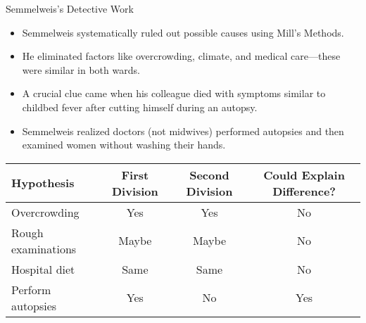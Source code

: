 \documentclass{beamer}
\begin{document}
\begin{frame}{Semmelweis's Detective Work}
    \begin{itemize}
        \item Semmelweis systematically ruled out possible causes using Mill's Methods.
        \item He eliminated factors like overcrowding, climate, and medical care—these were similar in both wards.
        \item A crucial clue came when his colleague died with symptoms similar to childbed fever after cutting himself during an autopsy.
        \item Semmelweis realized doctors (not midwives) performed autopsies and then examined women without washing their hands.
    \end{itemize}
    
    \begin{table}
        \scriptsize
        \centering
        \begin{tabular}{|l|c|c|c|}
            \hline
            \textbf{Hypothesis} & \textbf{First Division} & \textbf{Second Division} & \textbf{Could Explain Difference?} \\
            \hline
            Overcrowding & Yes & Yes & No \\
            \hline
            Rough examinations & Maybe & Maybe & No \\
            \hline
            Hospital diet & Same & Same & No \\
            \hline
            Perform autopsies & Yes & No & Yes \\
            \hline
        \end{tabular}
    \end{table}
\end{frame}
\end{document}
